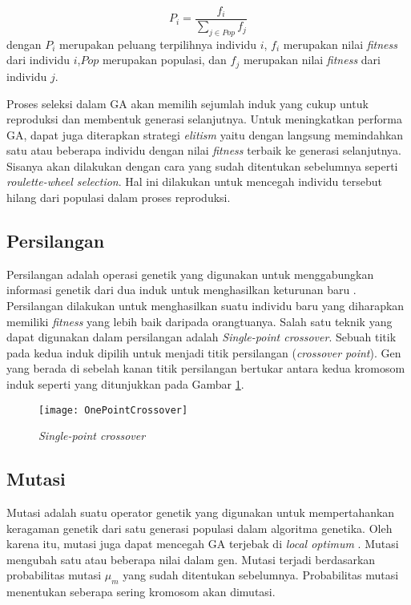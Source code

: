 \begin{equation}
	\label{eq:ProbSelection}
	P_i=\frac{f_i}{\sum_{j \in Pop} f_j}
\end{equation}
dengan $P_i$ merupakan peluang terpilihnya individu $i$, $f_i$ merupakan nilai \textit{fitness} dari individu $i$,$Pop$ merupakan populasi, dan $f_j$ merupakan nilai \textit{fitness} dari individu $j$.

Proses seleksi dalam GA akan memilih sejumlah induk yang cukup untuk reproduksi dan membentuk generasi selanjutnya. Untuk meningkatkan performa GA, dapat juga diterapkan strategi \textit{elitism} yaitu dengan langsung memindahkan satu atau beberapa individu dengan nilai \textit{fitness} terbaik ke generasi selanjutnya. Sisanya akan dilakukan dengan cara yang sudah ditentukan sebelumnya seperti \textit{roulette-wheel selection}. Hal ini dilakukan untuk mencegah individu tersebut hilang dari populasi dalam proses reproduksi.

\subsection{Persilangan}
\label{sub:crossover}
Persilangan adalah operasi genetik yang digunakan untuk menggabungkan informasi genetik dari dua induk untuk menghasilkan keturunan baru \cite{sivanandam2007introduction}. Persilangan dilakukan untuk menghasilkan suatu individu baru yang diharapkan memiliki \textit{fitness} yang lebih baik daripada orangtuanya. Salah satu teknik yang dapat digunakan dalam persilangan adalah \textit{Single-point crossover}. Sebuah titik pada kedua induk dipilih untuk menjadi titik persilangan (\textit{crossover point}). Gen yang berada di sebelah kanan titik persilangan bertukar antara kedua kromosom induk seperti yang ditunjukkan pada Gambar \ref{fig:spcrossover}.

\begin{figure}[h]
	\begin{center}
		\texttt{[image: OnePointCrossover]}
		\caption{\textit{Single-point crossover}}
		\label{fig:spcrossover}
	\end{center}
\end{figure}

\subsection{Mutasi}
\label{sub:mutation}
Mutasi adalah suatu operator genetik yang digunakan untuk mempertahankan keragaman genetik dari satu generasi populasi dalam algoritma genetika. Oleh karena itu, mutasi juga dapat mencegah GA terjebak di \textit{local optimum} \cite{sivanandam2007introduction}. Mutasi mengubah satu atau beberapa nilai dalam gen. Mutasi terjadi berdasarkan probabilitas mutasi $\mu_m$ yang sudah ditentukan sebelumnya. Probabilitas mutasi menentukan seberapa sering kromosom akan dimutasi. 

